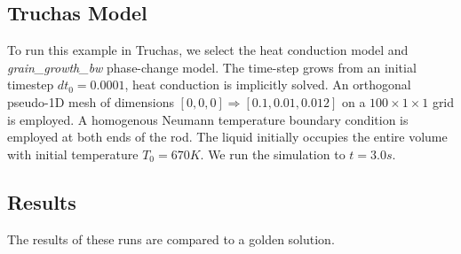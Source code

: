 \documentclass[12pt]{article}
\begin{document}
\subsection*{Truchas Model}

To run this example in Truchas, we select the heat conduction model
and {\em{grain\_growth\_bw}} phase-change model. The time-step grows from an
initial timestep $dt_0=0.0001$, heat conduction is implicitly solved. 
An orthogonal pseudo-1D mesh of dimensions $[0,0,0] \Rightarrow [0.1,0.01,0.012]$ 
on a $100 \times 1 \times 1$ grid is employed.
A homogenous Neumann temperature boundary condition 
is employed at both ends of the rod. The liquid initially occupies the entire
volume with initial temperature $T_0 = 670K$.  We run the simulation to $t=3.0s$.
 
\subsection*{Results}

The results of these runs are compared to a golden solution.
\end{document}
